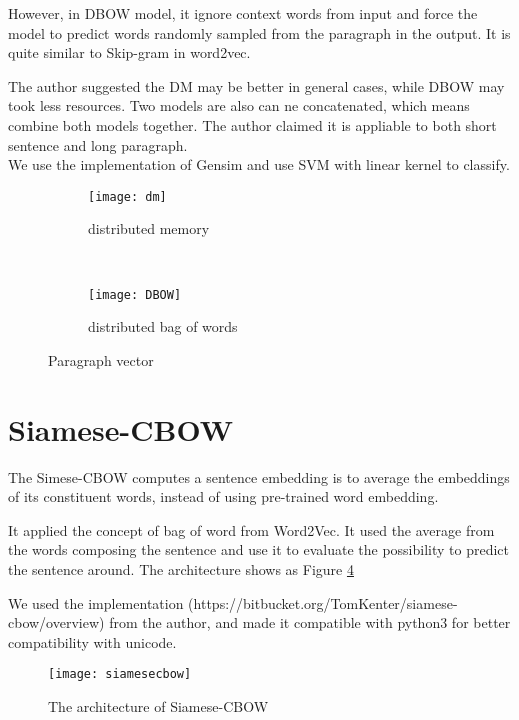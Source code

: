 However, in DBOW model, it ignore context words from input and force the model to predict words randomly sampled from the paragraph in the output.
It is quite similar to Skip-gram in word2vec.

The author suggested the DM may be better in general cases, while DBOW may took less resources. 
Two models are also can ne concatenated, which means combine both models together. The author claimed it is appliable to  both short sentence and long paragraph.\\

We use the implementation of Gensim and use SVM with linear kernel to classify.

\begin{figure}
\centering
\begin{subfigure}{.5\textwidth}
  \centering
  \texttt{[image: dm]}
  \caption{distributed memory}
  \label{fig:dm}
\end{subfigure}~
\begin{subfigure}{.5\textwidth}
  \centering
  \texttt{[image: DBOW]}
  \caption{distributed bag of words}
  \label{fig:dbow}
\end{subfigure}
\caption{Paragraph vector}
\label{fig:PVDM}
\end{figure}

\section{Siamese-CBOW}

	The Simese-CBOW\cite{kenter2016siamesecbow} computes a sentence embedding is to average the embeddings of its
constituent words, instead of using pre-trained word embedding. 

It applied the concept of bag of word from Word2Vec. It used the average from the words composing the sentence and use it to evaluate the possibility to predict the sentence around. 
The architecture shows as Figure \ref{fig:siamese}

We used the implementation (https://bitbucket.org/TomKenter/siamese-cbow/overview) from the author, and made it compatible with python3 for better compatibility with unicode.

\begin{figure}[h]
    \centering
	\texttt{[image: siamesecbow]}
    \caption{The architecture of Siamese-CBOW}
    \label{fig:siamese}
\end{figure}
